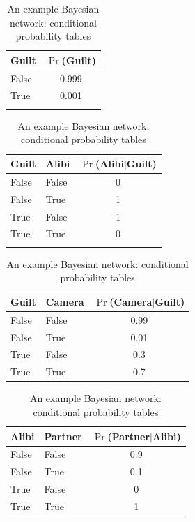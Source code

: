 \documentclass[10pt]{article}
\begin{document}
\begin{table}
	\centering
		\begin{tabular}{lc}
			Guilt & $\Pr$(Guilt)\\
			\hline
			False & 0.999\\
			True & 0.001\\
			& 
		\end{tabular}
		\quad
		\quad
		\quad
		\quad
		\quad
		\quad
		\quad
		\begin{tabular}{llc}
			Guilt &Alibi& $\Pr$(Alibi$|$Guilt)\\
			\hline
			False & False & 0\\
			False & True & 1\\
			True & False & 1\\
			True & True & 0\\
			& & 
		\end{tabular}
		\begin{tabular}{llc}
			Guilt &Camera& $\Pr$(Camera$|$Guilt)\\
			\hline
			False & False & 0.99\\
			False & True & 0.01\\
			True & False & 0.3\\
			True & True & 0.7\\
		\end{tabular}
		\quad
		\begin{tabular}{llc}
			Alibi &Partner& $\Pr$(Partner$|$Alibi)\\
			\hline
			False & False & 0.9\\
			False & True & 0.1\\
			True & False & 0\\
			True & True & 1\\
		\end{tabular}
\caption{An example Bayesian network: conditional probability tables\label{tab:BN}}
\end{table}
\end{document}
